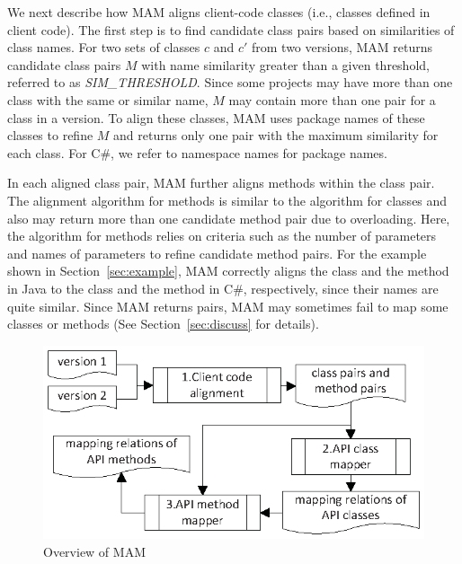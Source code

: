 We next describe how MAM aligns client-code classes (i.e., classes defined in client code).
The first step is to find candidate class pairs based on similarities of class names. For two sets
of classes $c$ and $c'$ from two versions, MAM returns candidate class
pairs $M$ with name similarity greater than a given threshold,
referred to as \emph{SIM\_THRESHOLD}. Since some projects may have more
than one class with the same or similar name, $M$ may contain more than one
pair for a class in a version. To align these classes, MAM uses package names of these classes to refine $M$ and
returns only one pair with the maximum
similarity for each class. For C\#, we refer to namespace names for package
names.

In each aligned class pair, MAM further aligns methods
within the class pair. The alignment algorithm for methods is similar to the
algorithm for classes and also may return more than one candidate
method pair due to overloading. Here, the algorithm for methods
relies on criteria such as the number of parameters and names of
parameters to refine candidate method pairs. For the example shown
in Section~\ref{sec:example}, MAM correctly aligns the
class  and the method  in Java to
the class  and the method  in C\#,
respectively, since their names are quite similar. Since MAM returns pairs, MAM may 
sometimes fail to map some classes or methods (See Section~\ref{sec:discuss} for details).
\begin{figure}[t]
\centering
\includegraphics[scale=0.9,clip]{figure/approach.eps}\vspace*{-3ex}
 \caption{Overview of MAM}\vspace*{-4ex}
 \label{fig:approach}
\end{figure}

